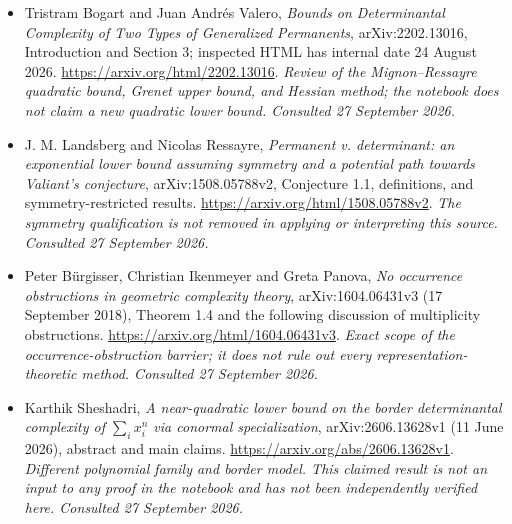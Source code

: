 \documentclass[11pt,a4paper]{article}
\numberwithin{equation}{section}
\begin{document}
\begin{itemize}
\item[\textnormal{[E1]}]\hypertarget{extra:statement:1}{} Tristram Bogart and Juan Andr\'es Valero, \emph{Bounds on Determinantal Complexity of Two Types of Generalized Permanents}, arXiv:2202.13016, Introduction and Section 3; inspected HTML has internal date 24 August 2026.
\url{https://arxiv.org/html/2202.13016}.
{\small\textit{Review of the Mignon--Ressayre quadratic bound, Grenet upper bound, and Hessian method; the notebook does not claim a new quadratic lower bound. Consulted 27 September 2026.}}
\item[\textnormal{[E2]}]\hypertarget{extra:statement:2}{} J. M. Landsberg and Nicolas Ressayre, \emph{Permanent v. determinant: an exponential lower bound assuming symmetry and a potential path towards Valiant's conjecture}, arXiv:1508.05788v2, Conjecture 1.1, definitions, and symmetry-restricted results.
\url{https://arxiv.org/html/1508.05788v2}.
{\small\textit{The symmetry qualification is not removed in applying or interpreting this source. Consulted 27 September 2026.}}
\item[\textnormal{[E3]}]\hypertarget{extra:statement:3}{} Peter B\"urgisser, Christian Ikenmeyer and Greta Panova, \emph{No occurrence obstructions in geometric complexity theory}, arXiv:1604.06431v3 (17 September 2018), Theorem 1.4 and the following discussion of multiplicity obstructions.
\url{https://arxiv.org/html/1604.06431v3}.
{\small\textit{Exact scope of the occurrence-obstruction barrier; it does not rule out every representation-theoretic method. Consulted 27 September 2026.}}
\item[\textnormal{[E4]}]\hypertarget{extra:statement:4}{} Karthik Sheshadri, \emph{A near-quadratic lower bound on the border determinantal complexity of $\sum_i x_i^n$ via conormal specialization}, arXiv:2606.13628v1 (11 June 2026), abstract and main claims.
\url{https://arxiv.org/abs/2606.13628v1}.
{\small\textit{Different polynomial family and border model. This claimed result is not an input to any proof in the notebook and has not been independently verified here. Consulted 27 September 2026.}}
\end{itemize}
\end{document}
